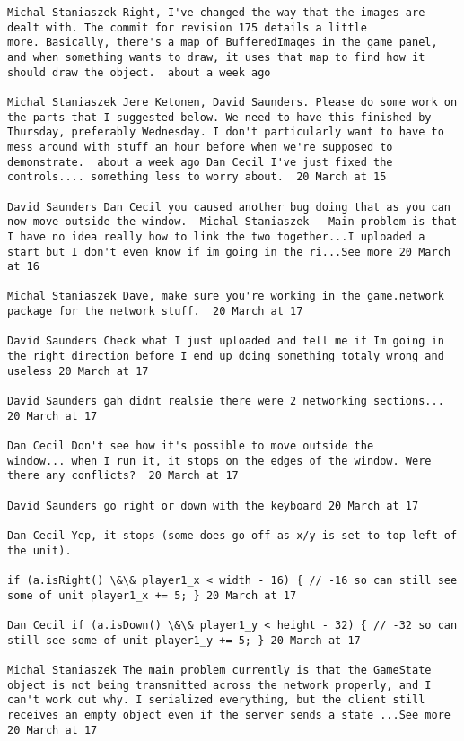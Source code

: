 \begin{verbatim}
Michal Staniaszek Right, I've changed the way that the images are
dealt with. The commit for revision 175 details a little
more. Basically, there's a map of BufferedImages in the game panel,
and when something wants to draw, it uses that map to find how it
should draw the object.  about a week ago

Michal Staniaszek Jere Ketonen, David Saunders. Please do some work on
the parts that I suggested below. We need to have this finished by
Thursday, preferably Wednesday. I don't particularly want to have to
mess around with stuff an hour before when we're supposed to
demonstrate.  about a week ago Dan Cecil I've just fixed the
controls.... something less to worry about.  20 March at 15

David Saunders ‎Dan Cecil you caused another bug doing that as you can
now move outside the window.  Michal Staniaszek - Main problem is that
I have no idea really how to link the two together...I uploaded a
start but I don't even know if im going in the ri...See more 20 March
at 16

Michal Staniaszek Dave, make sure you're working in the game.network
package for the network stuff.  20 March at 17

David Saunders Check what I just uploaded and tell me if Im going in
the right direction before I end up doing something totaly wrong and
useless 20 March at 17

David Saunders gah didnt realsie there were 2 networking sections...
20 March at 17

Dan Cecil Don't see how it's possible to move outside the
window... when I run it, it stops on the edges of the window. Were
there any conflicts?  20 March at 17

David Saunders go right or down with the keyboard 20 March at 17

Dan Cecil Yep, it stops (some does go off as x/y is set to top left of
the unit).

if (a.isRight() \&\& player1_x < width - 16) { // -16 so can still see
some of unit player1_x += 5; } 20 March at 17

Dan Cecil if (a.isDown() \&\& player1_y < height - 32) { // -32 so can
still see some of unit player1_y += 5; } 20 March at 17

Michal Staniaszek The main problem currently is that the GameState
object is not being transmitted across the network properly, and I
can't work out why. I serialized everything, but the client still
receives an empty object even if the server sends a state ...See more
20 March at 17


\end{verbatim}
